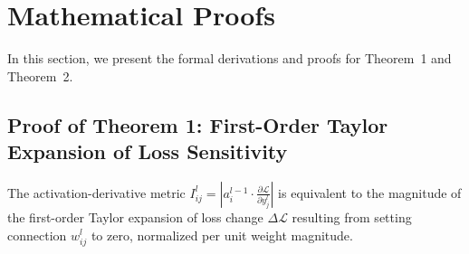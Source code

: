 \section{Mathematical Proofs}
\label{sec:appendix_proofs}

In this section, we present the formal derivations and proofs for Theorem~1 and Theorem~2.

\subsection{Proof of Theorem 1: First-Order Taylor Expansion of Loss Sensitivity}

\begin{theorem*}
The activation-derivative metric $I_{ij}^l = \left| a_i^{l-1} \cdot \frac{\partial \mathcal{L}}{\partial y_j^l} \right|$ is equivalent to the magnitude of the first-order Taylor expansion of loss change $\Delta \mathcal{L}$ resulting from setting connection $w_{ij}^l$ to zero, normalized per unit weight magnitude.
\end{theorem*}

